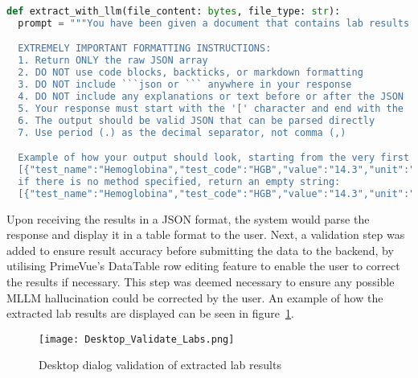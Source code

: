\begin{lstlisting}[language=Python, caption=Prompt for Lab Results Extraction]
def extract_with_llm(file_content: bytes, file_type: str):
  prompt = """You have been given a document that contains lab results that is written in the Romanian language. Your job is to extract all lab results from this document in JSON format with the following fields: test_name, test_code, value, unit, reference_range, method. Sometimes the code of the test will be in the name itself, and it is your job to determine if the code is there, for example in brackets or separated by a comma, and separate the name and the code. Sometimes the lab result will not have a method specified, and in that case you return an empty string. The document is in Romanian, however the JSON keys should be in English.

  EXTREMELY IMPORTANT FORMATTING INSTRUCTIONS:
  1. Return ONLY the raw JSON array
  2. DO NOT use code blocks, backticks, or markdown formatting
  3. DO NOT include ```json or ``` anywhere in your response
  4. DO NOT include any explanations or text before or after the JSON
  5. Your response must start with the '[' character and end with the ']' character
  6. The output should be valid JSON that can be parsed directly
  7. Use period (.) as the decimal separator, not comma (,)

  Example of how your output should look, starting from the very first character:
  [{"test_name":"Hemoglobina","test_code":"HGB","value":"14.3","unit":"mg/dL","reference_range":"13.2-17.3", "method":"Chemiluminiscenta"}]
  if there is no method specified, return an empty string:
  [{"test_name":"Hemoglobina","test_code":"HGB","value":"14.3","unit":"mg/dL","reference_range":"13.2-17.3", "method":" "}]"""  
\end{lstlisting}

Upon receiving the results in a JSON format, the system would parse the response and display it in a table format to the user. Next, a validation step was added to ensure result accuracy before submitting the data to the backend, by utilising PrimeVue's DataTable row editing feature to enable the user to correct the results if necessary. This step was deemed necessary to ensure any possible MLLM hallucination could be corrected by the user. An example of how the extracted lab results are displayed can be seen in figure~\ref{fig:labs_extracted}.

\begin{figure}[htbp]
  \centering
  \texttt{[image: Desktop\_Validate\_Labs.png]}
  \caption{Desktop dialog validation of extracted lab results}\label{fig:labs_extracted}
\end{figure}

